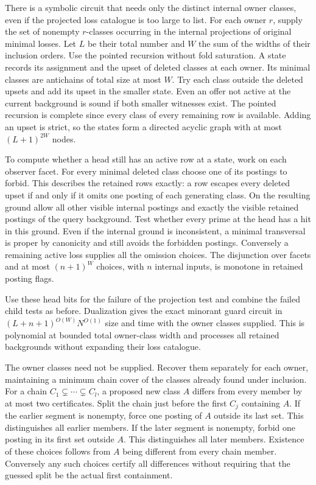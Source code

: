 There is a symbolic circuit that needs
only the distinct internal owner classes,
even if the projected loss catalogue is
too large to list. For each owner $r$,
supply the set of nonempty $r$-classes
occurring in the internal projections
of original minimal losses. Let $L$ be
their total number and $W$ the sum of
the widths of their inclusion orders.
Use the pointed recursion without fold
saturation. A state records its assignment
and the upset of deleted classes at each
owner. Its minimal classes are antichains
of total size at most $W$. Try each class
outside the deleted upsets and add its
upset in the smaller state. Even an offer
not active at the current background is
sound if both smaller witnesses exist.
The pointed recursion is complete since
every class of every remaining row is
available. Adding an upset is strict, so
the states form a directed acyclic graph
with at most $(L+1)^{2W}$ nodes.

To compute whether a head still has
an active row at a state, work on each
observer facet. For every minimal
deleted class choose one of its postings
to forbid. This describes the retained
rows exactly: a row escapes every
deleted upset if and only if it omits
one posting of each generating class.
On the resulting ground allow all other
visible internal postings and exactly
the visible retained postings of the
query background. Test whether every
prime at the head has a hit in this
ground. Even if the internal ground
is inconsistent, a minimal transversal
is proper by canonicity and still avoids
the forbidden postings. Conversely a
remaining active loss supplies all
the omission choices. The disjunction
over facets and at most $(n+1)^W$
choices, with $n$ internal inputs, is
monotone in retained posting flags.

Use these head bits for the failure
of the projection test and combine
the failed child tests as before.
Dualization gives the exact minorant
guard circuit in
$(L+n+1)^{O(W)}N^{O(1)}$ size and time
with the owner classes supplied.
This is polynomial at bounded total
owner-class width and processes all
retained backgrounds without expanding
their loss catalogue.

The owner classes need not be supplied.
Recover them separately for each owner,
maintaining a minimum chain cover of the
classes already found under inclusion.
For a chain $C_1\subsetneq\cdots\subsetneq C_l$,
a proposed new class $A$ differs from
every member by at most two certificates.
Split the chain just before the first
$C_j$ containing $A$. If the earlier
segment is nonempty, force one posting
of $A$ outside its last set. This
distinguishes all earlier members.
If the later segment is nonempty, forbid
one posting in its first set outside $A$.
This distinguishes all later members.
Existence of these choices follows from
$A$ being different from every chain
member. Conversely any such choices
certify all differences without requiring
that the guessed split be the actual
first containment.

